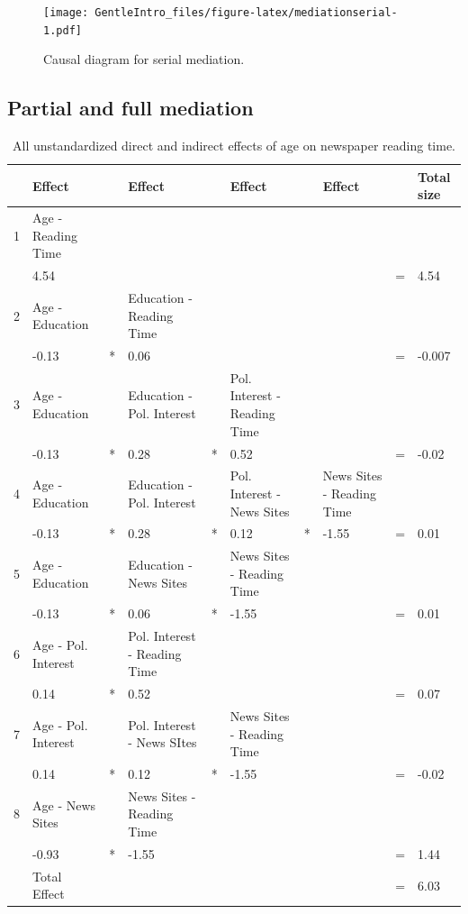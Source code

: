 \documentclass[a4paper]{book}
\theoremstyle{definition}
\theoremstyle{definition}
\theoremstyle{definition}
\theoremstyle{remark}
\begin{document}
\begin{figure}
\centering
\texttt{[image: GentleIntro\_files/figure-latex/mediationserial-1.pdf]}
\caption{\label{fig:mediationserial}Causal diagram for serial mediation.}
\end{figure}

\subsection{Partial and full mediation}\label{partialfullmediation}

\begin{table}

\caption{\label{tab:age-indirect}All unstandardized direct and indirect effects of age on newspaper reading time.}
\centering
\fontsize{8}{8}\selectfont
\begin{tabular}[t]{p{0.4cm} p{1.6cm} p{0.2cm} p{1.6cm} p{0.2cm} p{1.6cm} p{0.2cm} p{1.6cm} p{0.2cm} p{1.2cm}}
\hline
 & Effect &  & Effect &  & Effect &  & Effect &  & Total size\\
\hline
1 & Age - Reading Time &  &  &  &  &  &  &  & \\
 & 4.54 &  &  &  &  &  &  & = & 4.54\\
\hline
2 & Age - Education &  & Education - Reading Time &  &  &  &  &  & \\
 & -0.13 & * & 0.06 &  &  &  &  & = & -0.007\\
\hline
3 & Age - Education &  & Education - Pol. Interest &  & Pol. Interest - Reading Time &  &  &  & \\
 & -0.13 & * & 0.28 & * & 0.52 &  &  & = & -0.02\\
\hline
4 & Age - Education &  & Education - Pol. Interest &  & Pol. Interest - News Sites &  & News Sites - Reading Time &  & \\
 & -0.13 & * & 0.28 & * & 0.12 & * & -1.55 & = & 0.01\\
\hline
5 & Age - Education &  & Education - News Sites &  & News Sites - Reading Time &  &  &  & \\
 & -0.13 & * & 0.06 & * & -1.55 &  &  & = & 0.01\\
\hline
6 & Age - Pol. Interest &  & Pol. Interest - Reading Time &  &  &  &  &  & \\
 & 0.14 & * & 0.52 &  &  &  &  & = & 0.07\\
\hline
7 & Age - Pol. Interest &  & Pol. Interest - News SItes &  & News Sites - Reading Time &  &  &  & \\
 & 0.14 & * & 0.12 & * & -1.55 &  &  & = & -0.02\\
\hline
8 & Age - News Sites &  & News Sites - Reading Time &  &  &  &  &  & \\
 & -0.93 & * & -1.55 &  &  &  &  & = & 1.44\\
\hline
 & Total Effect &  &  &  &  &  &  & = & 6.03\\
\hline
\end{tabular}
\end{table}
\end{document}
